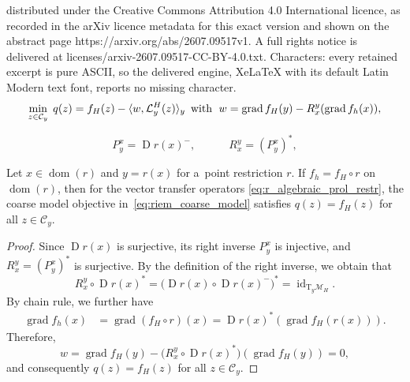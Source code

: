 \documentclass[10pt,a4paper]{amsart}
\DeclareMathOperator{\Drm}{D}
\DeclareMathOperator{\dom}{dom}
\DeclareMathOperator{\grad}{grad}
\DeclareMathOperator{\id}{id}
\def\restr{r}
\newcommand\calC{\mathcal C}
\newcommand{\M}{\mathcal{M}}
\newcommand{\Tan}{\mathrm{T}}
\newcommand{\invRet}{\mathcal L}
\begin{document}
distributed under the Creative Commons Attribution 4.0 International licence, as recorded in the arXiv licence metadata for this exact version and shown on the abstract page https://arxiv.org/abs/2607.09517v1. A full rights notice is delivered at licenses/arxiv-2607.09517-CC-BY-4.0.txt. Characters: every retained excerpt is pure ASCII, so the delivered engine, XeLaTeX with its default Latin Modern text font, reports no missing character.
	\begin{equation} \label{eq:riem_coarse_model}
		\min\limits_{z \in \calC_{y}} \; q(z) = f_H(z) - \langle w, \invRet^H_{y}(z)\rangle_{y}
		\enskip \text{with }\; w = \grad f_H(y) - R_{x}^{y}(\grad f_h(x)),
	\end{equation}

	\begin{equation} \label{eq:r_algebraic_prol_restr}
		P_y^x = \Drm \restr(x)^-, \qquad\quad
		R_x^y = (P_y^x)^\ast,    
	\end{equation}

	\begin{prop}\label{prop:algebraic1} Let $x \in \dom(r)$ and $y = \restr(x)$ for a~point restriction $\restr$.
		If $f_h = f_H \circ \restr$ on $\dom(r)$, then for the vector transfer operators \eqref{eq:r_algebraic_prol_restr}, the coarse model objective in~\eqref{eq:riem_coarse_model} satisfies $q(z) = f_H(z)$ for all $z\in \calC_{y}$.
	\end{prop}

	\begin{proof}
		Since $\Drm \restr(x)$ is surjective, its right inverse $P_{y}^{x}$ is injective, and $R_{x}^{y} = (P_{y}^{x})^\ast$ is surjective. 
		By the definition of the right inverse, we obtain that
		\[
		R_{x}^{y} \circ \Drm \restr(x)^\ast 
		= \big(\Drm \restr(x)\circ\Drm \restr(x)^-\big)^\ast
		= \id_{\Tan_{y}\M_H}.
		\]
		By chain rule, we further have 
		\begin{align*}
			\grad f_h(x) &= \grad (f_H \circ r)(x) 
			= \Drm \restr(x)^\ast(\grad f_H(\restr(x))).
		\end{align*}
		Therefore, 
		\[
		w 
		= \grad f_H(y)-\big(R_{x}^{y}\circ \Drm \restr(x)^\ast\big)(\grad f_H(y))
		= 0,
		\]
		and consequently $q(z) = f_H(z)$  for all $z \in \calC_{y}$.
	\end{proof}
\end{document}
